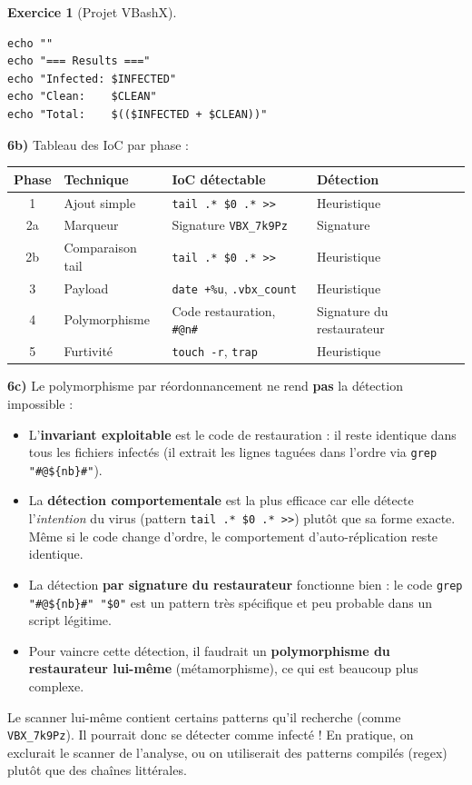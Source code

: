 \documentclass[a4paper,11pt]{article}
\theoremstyle{plain}
\theoremstyle{definition}
\newtheorem{exercice}{Exercice}
\begin{document}
\begin{exercice}[Projet VBashX]
\begin{correction}
\begin{lstlisting}[title=scanner.sh]
echo ""
echo "=== Results ==="
echo "Infected: $INFECTED"
echo "Clean:    $CLEAN"
echo "Total:    $(($INFECTED + $CLEAN))"
\end{lstlisting}

\textbf{6b)} Tableau des IoC par phase :
\begin{center}
\begin{tabular}{clll}
\toprule
\textbf{Phase} & \textbf{Technique} & \textbf{IoC détectable} & \textbf{Détection} \\
\midrule
1 & Ajout simple & \texttt{tail .* \$0 .* >>} & Heuristique \\
2a & Marqueur & Signature \texttt{VBX\_7k9Pz} & Signature \\
2b & Comparaison tail & \texttt{tail .* \$0 .* >>} & Heuristique \\
3 & Payload & \texttt{date +\%u}, \texttt{.vbx\_count} & Heuristique \\
4 & Polymorphisme & Code restauration, \texttt{\#@n\#} & Signature du restaurateur \\
5 & Furtivité & \texttt{touch -r}, \texttt{trap} & Heuristique \\
\bottomrule
\end{tabular}
\end{center}

\textbf{6c)} Le polymorphisme par réordonnancement ne rend \textbf{pas} la détection impossible :
\begin{itemize}
    \item L'\textbf{invariant exploitable} est le code de restauration : il reste identique dans tous les fichiers infectés (il extrait les lignes taguées dans l'ordre via \texttt{grep "\#@\$\{nb\}\#"}).
    \item La \textbf{détection comportementale} est la plus efficace car elle détecte l'\textit{intention} du virus (pattern \texttt{tail .* \$0 .* >>}) plutôt que sa forme exacte. Même si le code change d'ordre, le comportement d'auto-réplication reste identique.
    \item La détection \textbf{par signature du restaurateur} fonctionne bien : le code \texttt{grep "\#@\$\{nb\}\#" "\$0"} est un pattern très spécifique et peu probable dans un script légitime.
    \item Pour vaincre cette détection, il faudrait un \textbf{polymorphisme du restaurateur lui-même} (métamorphisme), ce qui est beaucoup plus complexe.
\end{itemize}

\begin{attention}
Le scanner lui-même contient certains patterns qu'il recherche (comme \texttt{VBX\_7k9Pz}). Il pourrait donc se détecter comme infecté ! En pratique, on exclurait le scanner de l'analyse, ou on utiliserait des patterns compilés (regex) plutôt que des chaînes littérales.
\end{attention}


\end{correction}
\end{exercice}
\end{document}
